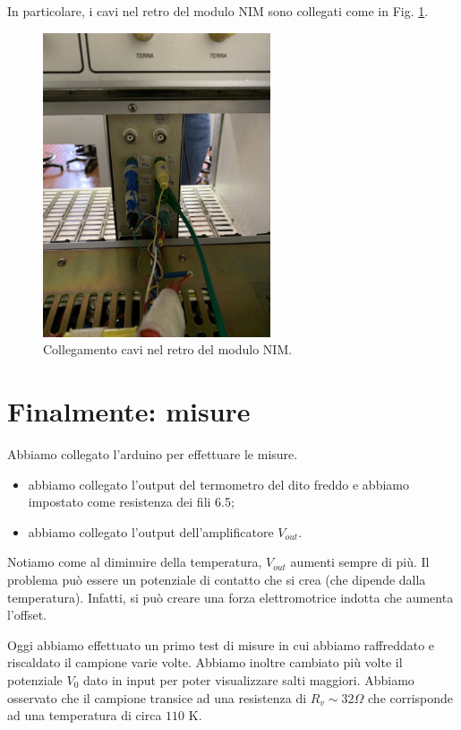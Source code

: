 \documentclass[../main/main.tex]{subfiles}
\begin{document}
In particolare, i cavi nel retro del modulo NIM sono collegati come in Fig. \ref{fig:16_2}.

\begin{figure}[h!]
\centering
\includegraphics[width=0.6\textwidth]{../lessons/image/16/retro_nim.jpg}
\caption{\label{fig:16_2} Collegamento cavi nel retro del modulo NIM.}
\end{figure}


\section{Finalmente: misure}
Abbiamo collegato l'arduino per effettuare le misure.
\begin{itemize}
\item abbiamo collegato l'output del termometro del dito freddo e abbiamo impostato come resistenza dei fili 6.5;
\item abbiamo collegato l'output dell'amplificatore \( V_{out} \).
\end{itemize}
Notiamo come al diminuire della temperatura, \( V_{out} \) aumenti sempre di più. Il problema può essere un potenziale di contatto che si crea (che dipende dalla temperatura). Infatti, si può creare una forza elettromotrice indotta che aumenta l'offset.

Oggi abbiamo effettuato un primo test di misure in cui abbiamo raffreddato e riscaldato il campione varie volte. Abbiamo inoltre cambiato più volte il potenziale \( V_0 \) dato in input per poter visualizzare salti maggiori. Abbiamo osservato che il campione transice ad una resistenza di \( R_v \sim 32 \Omega \) che corrisponde ad una temperatura di circa \( 110  \) K.
\end{document}

